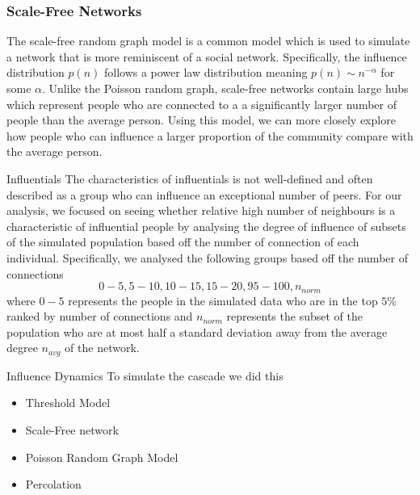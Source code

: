\documentclass[10pt, oneside, reqno]{amsart}
\makeatletter
\theoremstyle{plain}%
\theoremstyle{definition}
\theoremstyle{remark}
\renewcommand\subsection{\@startsection{subsection}{2}%
  \z@{.5\linespacing\@plus.7\linespacing}{-.5em}%
  {\normalfont\scshape}}
\makeatother
\begin{document}
\subsubsection{Scale-Free Networks}
The scale-free random graph model is a common model which is used to simulate a network that is more reminiscent of a social network. 
Specifically, the influence distribution $p(n)$ follows a power law distribution meaning $p(n) \sim n^{-\alpha}$ for some $\alpha$.
Unlike the Poisson random graph, scale-free networks contain large hubs which represent people who are connected to a a significantly larger number of people than the average person. 
Using this model, we can more closely explore how people who can influence a larger proportion of the community compare with the average person.


\subsection{Influentials}
The characteristics of influentials is not well-defined and often described as a group who can influence an exceptional number of peers.
For our analysis, we focused on seeing whether relative high number of neighbours is a characteristic of influential people by analysing the degree of influence of subsets of the simulated population based off the number of connection of each individual.
Specifically, we analysed the following groups based off the number of connections
\[ 0-5, 5-10, 10-15, 15-20, 95-100, n_{norm} \]
where $0-5$ represents the people in the simulated data who are in the top $5\%$ ranked by number of connections and $n_{norm}$ represents the subset of the population who are at most half a standard deviation away from the average degree $n_{avg}$ of the network.




\subsection{Influence Dynamics}
To simulate the cascade we did this \cite{github}


\begin{itemize}
    \item Threshold Model
    \item Scale-Free network
    \item Poisson Random Graph Model 
    \item Percolation
\end{itemize}
\end{document}
